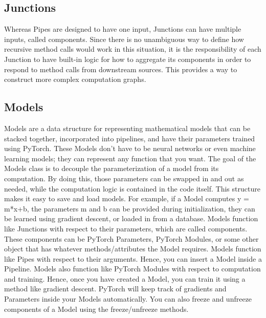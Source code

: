 \documentclass[letterpaper,10pt,english]{sphinxmanual}
\begin{document}
\subsection{Junctions}
\label{\detokenize{Fireworks:junctions}}
Whereas Pipes are designed to have one input, Junctions can have multiple inputs, called components. Since there is no unambiguous way to
define how recursive method calls would work in this situation, it is the responsibility of each Junction to have built-in logic for how to
aggregate its components in order to respond to method calls from downstream sources. This provides a way to construct more complex
computation graphs.


\subsection{Models}
\label{\detokenize{Fireworks:models}}
Models are a data structure for representing mathematical models that can be stacked together, incorporated into pipelines, and have their
parameters trained using PyTorch. These Models don’t have to be neural networks or even machine learning models; they can represent any
function that you want.
The goal of the Models class is to decouple the parameterization of a model from its computation. By doing this, those parameters can be
swapped in and out as needed, while the computation logic is contained in the code itself. This structure makes it easy to save and load models.
For example, if a Model computes y = m*x+b, the parameters m and b can be provided during initialization, they can be learned using gradient
descent, or loaded in from a database.
Models function like Junctions with respect to their parameters, which are called components. These components can be PyTorch Parameters,
PyTorch Modules, or some other object that has whatever methods/attributes the Model requires.
Models function like Pipes with respect to their arguments. Hence, you can insert a Model inside a Pipeline. Models also function like
PyTorch Modules with respect to computation and training. Hence, once you have created a Model, you can train it using a method like gradient
descent. PyTorch will keep track of gradients and Parameters inside your Models automatically. You can also freeze and unfreeze components
of a Model using the freeze/unfreeze methods.
\end{document}
